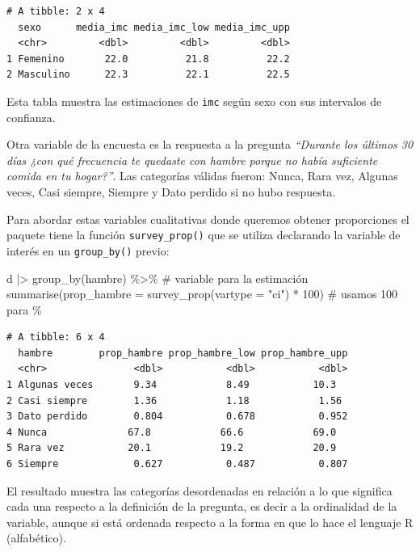 \documentclass[
  spanish,
  a4paper,
]{scrbook}
\newenvironment{Shaded}{\begin{snugshade}}{\end{snugshade}}
\newcommand{\AttributeTok}[1]{\textcolor[rgb]{0.40,0.45,0.13}{#1}}
\newcommand{\CommentTok}[1]{\textcolor[rgb]{0.37,0.37,0.37}{#1}}
\newcommand{\DecValTok}[1]{\textcolor[rgb]{0.68,0.00,0.00}{#1}}
\newcommand{\FunctionTok}[1]{\textcolor[rgb]{0.28,0.35,0.67}{#1}}
\newcommand{\NormalTok}[1]{\textcolor[rgb]{0.00,0.23,0.31}{#1}}
\newcommand{\SpecialCharTok}[1]{\textcolor[rgb]{0.37,0.37,0.37}{#1}}
\newcommand{\StringTok}[1]{\textcolor[rgb]{0.13,0.47,0.30}{#1}}
\begin{document}
\begin{verbatim}
# A tibble: 2 x 4
  sexo      media_imc media_imc_low media_imc_upp
  <chr>         <dbl>         <dbl>         <dbl>
1 Femenino       22.0          21.8          22.2
2 Masculino      22.3          22.1          22.5
\end{verbatim}

Esta tabla muestra las estimaciones de \texttt{imc} según sexo con sus
intervalos de confianza.

Otra variable de la encuesta es la respuesta a la pregunta
\emph{``Durante los últimos 30 días ¿con qué frecuencia te quedaste con
hambre porque no había suficiente comida en tu hogar?''}. Las categorías
válidas fueron: Nunca, Rara vez, Algunas veces, Casi siempre, Siempre y
Dato perdido si no hubo respuesta.

Para abordar estas variables cualitativas donde queremos obtener
proporciones el paquete tiene la función \texttt{survey\_prop()} que se
utiliza declarando la variable de interés en un \texttt{group\_by()}
previo:

\begin{Shaded}
\begin{Highlighting}[]
\NormalTok{d }\SpecialCharTok{|\textgreater{}}
  \FunctionTok{group\_by}\NormalTok{(hambre) }\SpecialCharTok{\%\textgreater{}\%} \CommentTok{\# variable para la estimación}
  \FunctionTok{summarise}\NormalTok{(}\AttributeTok{prop\_hambre =} \FunctionTok{survey\_prop}\NormalTok{(}\AttributeTok{vartype =} \StringTok{"ci"}\NormalTok{) }\SpecialCharTok{*} \DecValTok{100}\NormalTok{) }\CommentTok{\# usamos 100 para \%}
\end{Highlighting}
\end{Shaded}

\begin{verbatim}
# A tibble: 6 x 4
  hambre        prop_hambre prop_hambre_low prop_hambre_upp
  <chr>               <dbl>           <dbl>           <dbl>
1 Algunas veces       9.34            8.49           10.3  
2 Casi siempre        1.36            1.18            1.56 
3 Dato perdido        0.804           0.678           0.952
4 Nunca              67.8            66.6            69.0  
5 Rara vez           20.1            19.2            20.9  
6 Siempre             0.627           0.487           0.807
\end{verbatim}

El resultado muestra las categorías desordenadas en relación a lo que
significa cada una respecto a la definición de la pregunta, es decir a
la ordinalidad de la variable, aunque si está ordenada respecto a la
forma en que lo hace el lenguaje R (alfabético).
\end{document}
